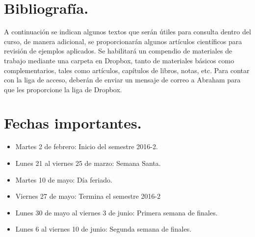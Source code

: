 \documentclass[12pt]{article}
\begin{document}
\section{Bibliografía.}
A continuación se indican algunos textos que serán útiles para consulta dentro del curso, de manera adicional, se proporcionarán algunos artículos científicos para revisión de ejemplos aplicados. Se habilitará un compendio de materiales de trabajo mediante una carpeta en Dropbox, tanto de materiales básicos como complementarios, tales como artículos, capítulos de libros, notas, etc. Para contar con la liga de acceso, deberán de enviar un mensaje de correo a Abraham para que les proporcione la liga de Dropbox.
\nocite{*}
\renewcommand{\refname}{Bibliografía básica.}

\section{Fechas importantes.}
\begin{itemize}
\item Martes 2 de febrero: Inicio del semestre 2016-2.
\item Lunes 21 al viernes 25 de marzo: Semana Santa.
\item Martes 10 de mayo: Día feriado.
\item Viernes 27 de mayo: Termina el semestre 2016-2
\item Lunes 30 de mayo al viernes 3 de junio: Primera semana de finales.
\item Lunes 6 al viernes 10 de junio: Segunda semana de finales.
\end{itemize}
\end{document}
